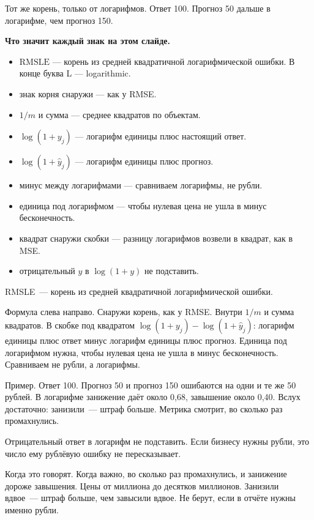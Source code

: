 \documentclass[11pt,a4paper]{article}
\newcommand{\slidehead}[2]{\par\vspace{4mm}{\color{navy}\large\bfseries Слайд #1. #2}\par\vspace{1mm}}
\newcommand{\screen}[1]{\par{\color{ink}\small #1\par}\vspace{1mm}}
\newcommand{\say}[1]{\begin{saybox}#1\end{saybox}}
\newenvironment{signs}{\begin{signbox}{\bfseries Что значит каждый знак на этом слайде.}\par\begin{itemize}[leftmargin=1.15em,itemsep=2pt,topsep=3pt,parsep=0pt]}{\end{itemize}\end{signbox}}
\begin{document}
\slidehead{26}{RMSLE}
\screen{Тот же корень, только от логарифмов. Ответ 100. Прогноз 50 дальше в логарифме, чем прогноз 150.}
\begin{signs}
\item \(\mathrm{RMSLE}\) — корень из средней квадратичной логарифмической ошибки. В конце буква L — logarithmic.
\item знак корня снаружи — как у RMSE.
\item \(1/m\) и сумма — среднее квадратов по объектам.
\item \(\log(1+y_j)\) — логарифм единицы плюс настоящий ответ.
\item \(\log(1+\hat y_j)\) — логарифм единицы плюс прогноз.
\item минус между логарифмами — сравниваем логарифмы, не рубли.
\item единица под логарифмом — чтобы нулевая цена не ушла в минус бесконечность.
\item квадрат снаружи скобки — разницу логарифмов возвели в квадрат, как в MSE.
\item отрицательный \(y\) в \(\log(1+y)\) не подставить.
\end{signs}
\say{RMSLE~--- корень из средней квадратичной логарифмической ошибки.

Формула слева направо. Снаружи корень, как у RMSE. Внутри \(1/m\) и сумма квадратов. В скобке под квадратом \(\log(1+y_j)-\log(1+\hat y_j)\): логарифм единицы плюс ответ минус логарифм единицы плюс прогноз. Единица под логарифмом нужна, чтобы нулевая цена не ушла в минус бесконечность. Сравниваем не рубли, а логарифмы.

Пример. Ответ 100. Прогноз 50 и прогноз 150 ошибаются на одни и те же 50 рублей. В логарифме занижение даёт около 0,68, завышение около 0,40. Вслух достаточно: занизили~--- штраф больше. Метрика смотрит, во сколько раз промахнулись.

Отрицательный ответ в логарифм не подставить. Если бизнесу нужны рубли, это число ему рублёвую ошибку не пересказывает.

Когда это говорят. Когда важно, во сколько раз промахнулись, и занижение дороже завышения. Цены от миллиона до десятков миллионов. Занизили вдвое~--- штраф больше, чем завысили вдвое. Не берут, если в отчёте нужны именно рубли.}
\end{document}
